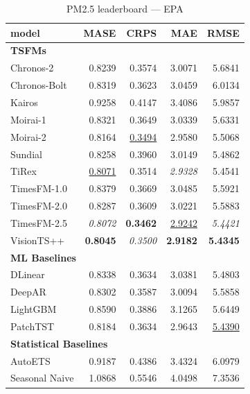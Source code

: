 \begin{table}[H]
\caption{PM2.5 leaderboard --- EPA}
\centering
\begin{small}
\begin{tabular}{lrrrr}
\toprule
model & MASE & CRPS & MAE & RMSE \\
\midrule
\multicolumn{5}{l}{\textbf{TSFMs}} \\
Chronos-2 & 0.8239 & 0.3574 & 3.0071 & 5.6841 \\
Chronos-Bolt & 0.8319 & 0.3623 & 3.0459 & 6.0134 \\
Kairos & 0.9258 & 0.4147 & 3.4086 & 5.9857 \\
Moirai-1 & 0.8321 & 0.3649 & 3.0339 & 5.6331 \\
Moirai-2 & 0.8164 & \underline{0.3494} & 2.9580 & 5.5068 \\
Sundial & 0.8258 & 0.3960 & 3.0149 & 5.4862 \\
TiRex & \underline{0.8071} & 0.3514 & \textit{2.9328} & 5.4541 \\
TimesFM-1.0 & 0.8379 & 0.3669 & 3.0485 & 5.5921 \\
TimesFM-2.0 & 0.8287 & 0.3609 & 3.0221 & 5.5883 \\
TimesFM-2.5 & \textit{0.8072} & \textbf{0.3462} & \underline{2.9242} & \textit{5.4421} \\
VisionTS++ & \textbf{0.8045} & \textit{0.3500} & \textbf{2.9182} & \textbf{5.4345} \\
\midrule
\multicolumn{5}{l}{\textbf{ML Baselines}} \\
DLinear & 0.8338 & 0.3634 & 3.0381 & 5.4803 \\
DeepAR & 0.8302 & 0.3587 & 3.0094 & 5.5858 \\
LightGBM & 0.8590 & 0.3886 & 3.1265 & 5.6449 \\
PatchTST & 0.8184 & 0.3634 & 2.9643 & \underline{5.4390} \\
\midrule
\multicolumn{5}{l}{\textbf{Statistical Baselines}} \\
AutoETS & 0.9187 & 0.4386 & 3.4324 & 6.0979 \\
Seasonal Naive & 1.0868 & 0.5546 & 4.0498 & 7.3536 \\
\bottomrule
\end{tabular}
\end{small}
\end{table}